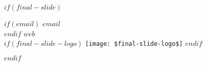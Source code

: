 $if(final-slide)$
\begin{frame}
\begin{centering}
\vfill
$if(email)$
\faEnvelope \; \textbf{$email$} \\
$endif$
\vspace{10pt}
\faGlobe \; \textbf{$web$} \\
\vspace{20pt}
$if(final-slide-logo)$
  \texttt{[image: \$final-slide-logo\$]}
$endif$
\vfill
\end{centering}
\end{frame}
$endif$
